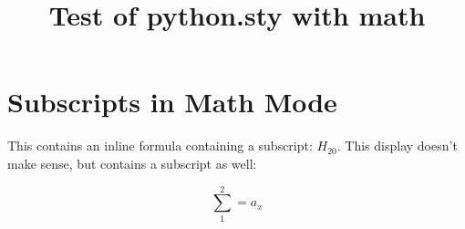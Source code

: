 \documentclass{howto}
\title{Test of python.sty with math}
\begin{document}
\maketitle

\section{Subscripts in Math Mode}

This contains an inline formula containing a subscript: $H_20$.
This display doesn't make sense, but contains a subscript as well:

$$\sum_1^2 = a_x$$
\end{document}
